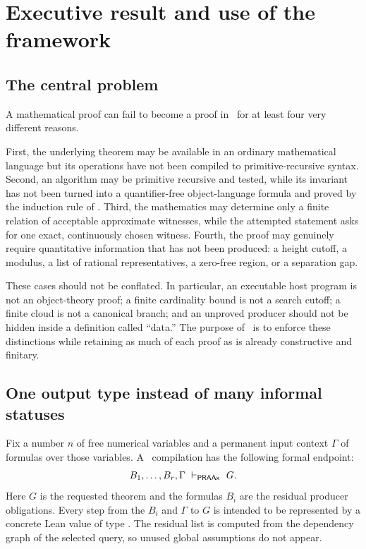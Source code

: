 \section{Executive result and use of the framework}

\subsection{The central problem}

A mathematical proof can fail to become a proof in \iPRA\ for at least four very different reasons.

First, the underlying theorem may be available in an ordinary mathematical language but its operations have not been compiled to primitive-recursive syntax.  Second, an algorithm may be primitive recursive and tested, while its invariant has not been turned into a quantifier-free object-language formula and proved by the induction rule of \iPRA.  Third, the mathematics may determine only a finite relation of acceptable approximate witnesses, while the attempted statement asks for one exact, continuously chosen witness.  Fourth, the proof may genuinely require quantitative information that has not been produced: a height cutoff, a modulus, a list of rational representatives, a zero-free region, or a separation gap.

These cases should not be conflated.  In particular, an executable host program is not an object-theory proof; a finite cardinality bound is not a search cutoff; a finite cloud is not a canonical branch; and an unproved producer should not be hidden inside a definition called ``data.''  The purpose of \CIFER\ is to enforce these distinctions while retaining as much of each proof as is already constructive and finitary.

\subsection{One output type instead of many informal statuses}

Fix a number \(n\) of free numerical variables and a permanent input context \(\Gamma\) of formulas over those variables.  A \CIFER\ compilation has the following formal endpoint:
\begin{equation}\label{eq:residual-endpoint}
 B_1,\ldots,B_r,\Gamma\ \vdash_{\mathsf{PRAAx}}\ G.
\end{equation}
Here \(G\) is the requested theorem and the formulas \(B_i\) are the residual producer obligations.  Every step from the \(B_i\) and \(\Gamma\) to \(G\) is intended to be represented by a concrete Lean value of type .  The residual list is computed from the dependency graph of the selected query, so unused global assumptions do not appear.

